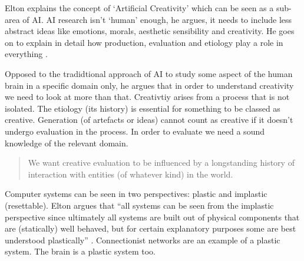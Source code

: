 \spirals

Elton explains the concept of `Artificial Creativity' which can be seen as a sub-area of \ac{AI}. \ac{AI} research isn't `human' enough, he argues, it needs to include less abstract ideas like emotions, morals, aesthetic sensibility and creativity. He goes on to explain in detail how production, evaluation and etiology play a role in everything \autocite{Elton1995}.

Opposed to the tradidtional approach of \ac{AI} to study some aspect of the human brain in a specific domain only, he argues that in order to understand creativity we need to look at more than that. Creativtiy arises from a process that is not isolated. The etiology (its history) is essential for something to be classed as creative. Generation (of artefacts or ideas) cannot count as creative if it doesn't undergo evaluation in the process. In order to evaluate we need a sound knowledge of the relevant domain. 

\begin{quotation}
  We want creative evaluation to be influenced by a longstanding history of interaction with entities (of whatever kind) in the world. 
\end{quotation}
  
Computer systems can be seen in two perspectives: plastic and implastic (resettable). Elton argues that ``all systems can be seen from the implastic perspective since ultimately all systems are built out of physical components that are (statically) well behaved, but for certain explanatory purposes some are best understood plastically'' \citeyear{Elton1995}. Connectionist networks are an example of a plastic system. The brain is a plastic system too.



